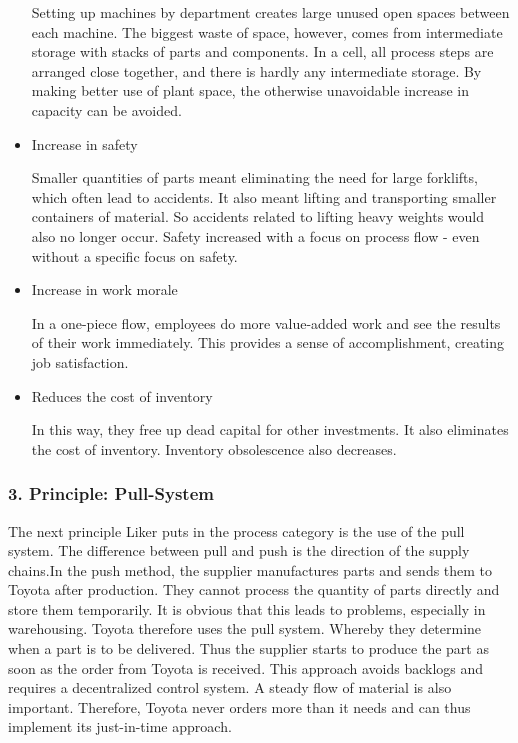 \documentclass[a4paper,11pt]{article}
\begin{document}
\begin{itemize}
  Setting up machines by department creates large unused open spaces between
  each machine. The biggest waste of space, however, comes from intermediate
  storage with stacks of parts and components. In a cell, all process steps
  are arranged close together, and there is hardly any intermediate
  storage. By making better use of plant space, the otherwise unavoidable
  increase in capacity can be avoided.
\item Increase in safety

  Smaller quantities of parts meant eliminating the need for large forklifts,
  which often lead to accidents. It also meant lifting and transporting
  smaller containers of material. So accidents related to lifting heavy
  weights would also no longer occur. Safety increased with a focus on process
  flow - even without a specific focus on safety.
\item Increase in work morale

  In a one-piece flow, employees do more value-added work and see the results
  of their work immediately. This provides a sense of accomplishment, creating
  job satisfaction.
\item Reduces the cost of inventory

  In this way, they free up dead capital for other investments. It also
  eliminates the cost of inventory. Inventory obsolescence also decreases.
\end{itemize}

\subsubsection*{3. Principle: Pull-System}

The next principle Liker puts in the process category is the use of the pull
system. The difference between pull and push is the direction of the supply
chains.In the push method, the supplier manufactures parts and sends them to
Toyota after production. They cannot process the quantity of parts directly
and store them temporarily. It is obvious that this leads to problems,
especially in warehousing. Toyota therefore uses the pull system. Whereby they
determine when a part is to be delivered. Thus the supplier starts to produce
the part as soon as the order from Toyota is received. This approach avoids
backlogs and requires a decentralized control system. A steady flow of
material is also important. Therefore, Toyota never orders more than it needs
and can thus implement its just-in-time approach.
\end{document}
